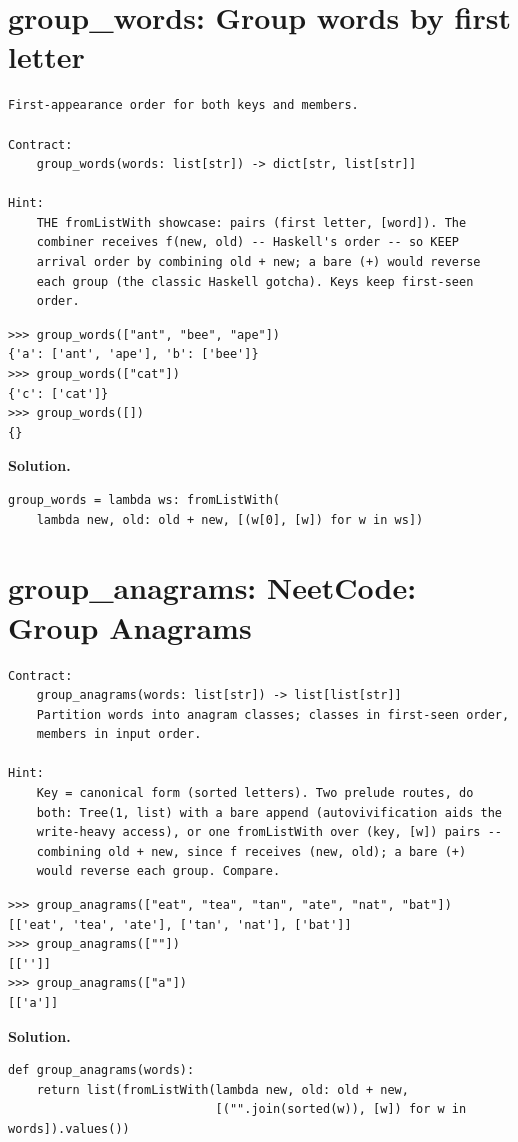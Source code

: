 \documentclass[10pt,letterpaper]{book}
\begin{document}
\section{group\_words: Group words by first letter}
\begin{lstlisting}[style=ex]
First-appearance order for both keys and members.

Contract:
    group_words(words: list[str]) -> dict[str, list[str]]

Hint:
    THE fromListWith showcase: pairs (first letter, [word]). The
    combiner receives f(new, old) -- Haskell's order -- so KEEP
    arrival order by combining old + new; a bare (+) would reverse
    each group (the classic Haskell gotcha). Keys keep first-seen
    order.
\end{lstlisting}
\begin{lstlisting}[style=ex]
>>> group_words(["ant", "bee", "ape"])
{'a': ['ant', 'ape'], 'b': ['bee']}
>>> group_words(["cat"])
{'c': ['cat']}
>>> group_words([])
{}
\end{lstlisting}
\noindent\textbf{Solution.}
\begin{lstlisting}[style=code]
group_words = lambda ws: fromListWith(
    lambda new, old: old + new, [(w[0], [w]) for w in ws])
\end{lstlisting}

\section{group\_anagrams: NeetCode: Group Anagrams}
\begin{lstlisting}[style=ex]
Contract:
    group_anagrams(words: list[str]) -> list[list[str]]
    Partition words into anagram classes; classes in first-seen order,
    members in input order.

Hint:
    Key = canonical form (sorted letters). Two prelude routes, do
    both: Tree(1, list) with a bare append (autovivification aids the
    write-heavy access), or one fromListWith over (key, [w]) pairs --
    combining old + new, since f receives (new, old); a bare (+)
    would reverse each group. Compare.
\end{lstlisting}
\begin{lstlisting}[style=ex]
>>> group_anagrams(["eat", "tea", "tan", "ate", "nat", "bat"])
[['eat', 'tea', 'ate'], ['tan', 'nat'], ['bat']]
>>> group_anagrams([""])
[['']]
>>> group_anagrams(["a"])
[['a']]
\end{lstlisting}
\noindent\textbf{Solution.}
\begin{lstlisting}[style=code]
def group_anagrams(words):
    return list(fromListWith(lambda new, old: old + new,
                             [("".join(sorted(w)), [w]) for w in words]).values())
\end{lstlisting}
\end{document}
